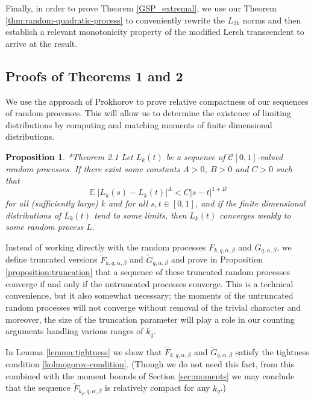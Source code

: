 \documentclass[12pt, a4paper]{amsart}
\newtheorem{proposition}{Proposition}
\theoremstyle{remark}
\newcommand{\abs}[1]{\left|#1\right|}
\DeclareMathOperator{\E}{\mathbb{E}}
\begin{document}
Finally, in order to prove Theorem \ref{GSP_extremal}, we use our Theorem
\ref{thm:random-quadratic-process} to conveniently rewrite the $L_{2k}$ norms and then establish a relevant monotonicity property of the modified Lerch
transcendent to arrive at the result.

\subsection{Proofs of Theorems 1 and 2}

We use the approach of Prokhorov to prove relative compactness of our
sequences of random processes. This will allow us to determine the
existence of limiting distributions by computing and matching moments of finite
dimensional distributions.

\begin{proposition}\label{prop:prokhorov-criteria}\cite{prokhorov}*{Theorem 2.1}
    Let $L_k(t)$ be a sequence of $\mathscr C[0,1]$-valued random processes.
    If there exist some constants $A > 0$, $B > 0$ and $C > 0$
    such that
    \begin{equation}\label{kolmogorov-condition}
        \E \abs{L_k(s) - L_k(t)}^A < C\abs{s - t}^{1 + B}
    \end{equation}
    for all (sufficiently large) $k$ and for all $s, t\in [0, 1]$, and if the finite
    dimensional distributions of $L_k(t)$ tend to some limits, then $L_k(t)$
    converges weakly to some random process $L$.
\end{proposition}



Instead of working directly with the random processes $F_{k,q,\alpha,\beta}$ and
$G_{q,\alpha,\beta}$, we define truncated versions $\tilde F_{k,q,\alpha,\beta}$
and $\tilde G_{q,\alpha,\beta}$ and prove in Proposition \ref{proposition:truncation}
that a sequence of these truncated random processes converge if and only if the
untruncated processes converge. This is a technical convenience, but it also
somewhat necessary; the moments of the untruncated random processes will not
converge without removal of the trivial character and moreover, the size of the truncation parameter will play a role in our counting arguments handling various ranges of $k_q.$

In Lemma \ref{lemma:tightness} we show that $\tilde F_{k,q,\alpha,\beta}$ and
$\tilde G_{q,\alpha,\beta}$ satisfy the tightness condition
\eqref{kolmogorov-condition}. (Though we do not need this fact, from this combined
with the moment bounds of Section \ref{sec:moments} we may conclude
that the sequence $\tilde F_{k_q,q, \alpha,\beta}$ is relatively compact for any $k_q$.)
\end{document}
